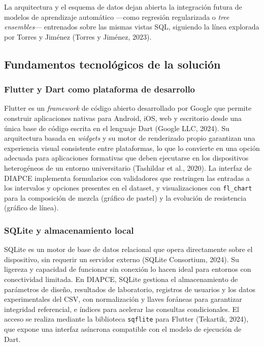 La arquitectura y el esquema de datos dejan abierta la integración futura de modelos de aprendizaje automático —como regresión regularizada o \textit{tree ensembles}— entrenados sobre las mismas vistas SQL, siguiendo la línea explorada por Torres y Jiménez (Torres y Jiménez, 2023).

\subsection{Fundamentos tecnológicos de la solución}

\subsubsection*{Flutter y Dart como plataforma de desarrollo}

Flutter es un \textit{framework} de código abierto desarrollado por Google que permite construir aplicaciones nativas para Android, iOS, web y escritorio desde una única base de código escrita en el lenguaje Dart (Google LLC, 2024). Su arquitectura basada en \textit{widgets} y su motor de renderizado propio garantizan una experiencia visual consistente entre plataformas, lo que lo convierte en una opción adecuada para aplicaciones formativas que deben ejecutarse en los dispositivos heterogéneos de un entorno universitario (Tashildar et al., 2020). La interfaz de DIAPCE implementa formularios con validadores que restringen las entradas a los intervalos y opciones presentes en el dataset, y visualizaciones con \texttt{fl\_chart} para la composición de mezcla (gráfico de pastel) y la evolución de resistencia (gráfico de línea).

\subsubsection*{SQLite y almacenamiento local}

SQLite es un motor de base de datos relacional que opera directamente sobre el dispositivo, sin requerir un servidor externo (SQLite Consortium, 2024). Su ligereza y capacidad de funcionar sin conexión lo hacen ideal para entornos con conectividad limitada. En DIAPCE, SQLite gestiona el almacenamiento de parámetros de diseño, resultados de laboratorio, registros de usuarios y los datos experimentales del CSV, con normalización y llaves foráneas para garantizar integridad referencial, e índices para acelerar las consultas condicionales. El acceso se realiza mediante la biblioteca \texttt{sqflite} para Flutter (Tekartik, 2024), que expone una interfaz asíncrona compatible con el modelo de ejecución de Dart.

